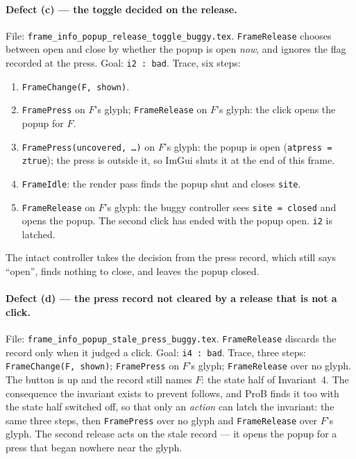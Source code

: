 \documentclass[a4paper,10pt,fleqn]{article}
\begin{document}
\paragraph{Defect (c) --- the toggle decided on the release.}
File: \texttt{frame\_info\_popup\_release\_toggle\_buggy.tex}.
\texttt{FrameRelease} chooses between open and close by whether the popup is
open \emph{now}, and ignores the flag recorded at the press.  Goal:
\texttt{i2 : bad}.  Trace, six steps:
\begin{enumerate}
  \item \texttt{FrameChange(F, shown)}.
  \item \texttt{FramePress} on $F$'s glyph; \texttt{FrameRelease} on $F$'s glyph:
    the click opens the popup for $F$.
  \item \texttt{FramePress(uncovered, \ldots)} on $F$'s glyph: the popup is open
    (\texttt{atpress = ztrue}); the press is outside it, so ImGui shuts it at
    the end of this frame.
  \item \texttt{FrameIdle}: the render pass finds the popup shut and closes
    \texttt{site}.
  \item \texttt{FrameRelease} on $F$'s glyph: the buggy controller sees
    \texttt{site = closed} and opens the popup.  The second click has ended with
    the popup open.  \texttt{i2} is latched.
\end{enumerate}
The intact controller takes the decision from the press record, which still
says ``open'', finds nothing to close, and leaves the popup closed.

\paragraph{Defect (d) --- the press record not cleared by a release that is
not a click.}
File: \texttt{frame\_info\_popup\_stale\_press\_buggy.tex}.
\texttt{FrameRelease} discards the record only when it judged a click.  Goal:
\texttt{i4 : bad}.  Trace, three steps: \texttt{FrameChange(F, shown)};
\texttt{FramePress} on $F$'s glyph; \texttt{FrameRelease} over no glyph.  The
button is up and the record still names $F$: the state half of Invariant~4.  The
consequence the invariant exists to prevent follows, and ProB finds it too with
the state half switched off, so that only an \emph{action} can latch the
invariant: the same three steps, then \texttt{FramePress} over no glyph and
\texttt{FrameRelease} over $F$'s glyph.  The second release acts on the stale
record --- it opens the popup for a press that began nowhere near the glyph.
\end{document}
